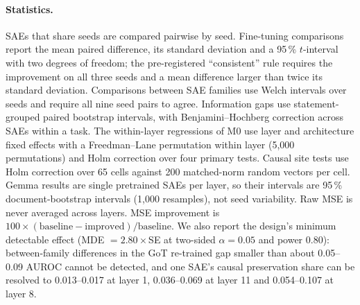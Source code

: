 \paragraph{Statistics.} SAEs that share seeds are compared pairwise by seed. Fine-tuning comparisons report the mean
paired difference, its standard deviation and a 95\,\% $t$-interval with two degrees of freedom; the pre-registered
``consistent'' rule requires the improvement on all three seeds and a mean difference larger than twice its standard
deviation. Comparisons between SAE families use Welch intervals over seeds and require all nine seed pairs to agree.
Information gaps use statement-grouped paired bootstrap intervals, with Benjamini--Hochberg correction across SAEs
within a task. The within-layer regressions of M0 use layer and architecture fixed effects with a Freedman--Lane
permutation within layer (5{,}000 permutations) and Holm correction over four primary tests. Causal site tests use
Holm correction over 65 cells against 200 matched-norm random vectors per cell. Gemma results are single pretrained
SAEs per layer, so their intervals are 95\,\% document-bootstrap intervals (1{,}000 resamples), not seed variability.
Raw MSE is never averaged across layers. MSE improvement is $100\times(\text{baseline}-\text{improved})/\text{baseline}$.
We also report the design's minimum detectable effect (MDE $=2.80\times$SE at two-sided $\alpha=0.05$ and power 0.80):
between-family differences in the GoT re-trained gap smaller than about 0.05--0.09 AUROC cannot be detected, and one
SAE's causal preservation share can be resolved to 0.013--0.017 at layer 1, 0.036--0.069 at layer 11 and
0.054--0.107 at layer 8.
